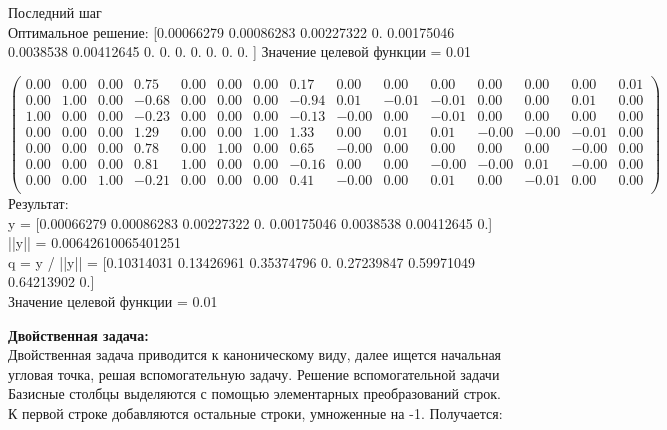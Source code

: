 \documentclass{article}
\begin{document}
\begin{flushleft}
    
    Последний шаг\\
    Оптимальное решение:
    [0.00066279 0.00086283 0.00227322 0.         0.00175046 0.0038538
    0.00412645 0.         0.         0.         0.         0.
    0.         0.        ]
    Значение целевой функции = 0.01

\begin{equation*}
\begin{pmatrix}
 0.00 & 0.00 & 0.00 &  0.75 & 0.00 & 0.00 & 0.00 &  0.17 &  0.00 &  0.00 &  0.00 &  0.00 &  0.00 &  0.00 & 0.01 \\
 0.00 & 1.00 & 0.00 & -0.68 & 0.00 & 0.00 & 0.00 & -0.94 &  0.01 & -0.01 & -0.01 &  0.00 &  0.00 &  0.01 & 0.00 \\
 1.00 & 0.00 & 0.00 & -0.23 & 0.00 & 0.00 & 0.00 & -0.13 & -0.00 &  0.00 & -0.01 &  0.00 &  0.00 &  0.00 & 0.00 \\
 0.00 & 0.00 & 0.00 &  1.29 & 0.00 & 0.00 & 1.00 &  1.33 &  0.00 &  0.01 &  0.01 & -0.00 & -0.00 & -0.01 & 0.00 \\
 0.00 & 0.00 & 0.00 &  0.78 & 0.00 & 1.00 & 0.00 &  0.65 & -0.00 &  0.00 &  0.00 &  0.00 &  0.00 & -0.00 & 0.00 \\
 0.00 & 0.00 & 0.00 &  0.81 & 1.00 & 0.00 & 0.00 & -0.16 &  0.00 &  0.00 & -0.00 & -0.00 &  0.01 & -0.00 & 0.00 \\
 0.00 & 0.00 & 1.00 & -0.21 & 0.00 & 0.00 & 0.00 &  0.41 & -0.00 &  0.00 &  0.01 &  0.00 & -0.01 &  0.00 & 0.00 \\

\end{pmatrix}
\end{equation*}
Результат: \\ y = [0.00066279 0.00086283 0.00227322 0. 0.00175046 0.0038538 0.00412645 0.] \\
 ||y|| = 0.00642610065401251 \\
 q = y / ||y|| =  [0.10314031 0.13426961 0.35374796 0. 0.27239847 0.59971049 0.64213902 0.] \\
 Значение целевой функции = 0.01 \\
\end{flushleft}


\textbf{Двойственная задача:} \\
Двойственная задача приводится к каноническому виду, далее ищется начальная угловая точка, решая вспомогательную задачу.
Решение вспомогательной задачи
Базисные столбцы выделяются с помощью элементарных преобразований строк. К первой строке добавляются остальные строки, умноженные на -1. Получается:
\end{document}
